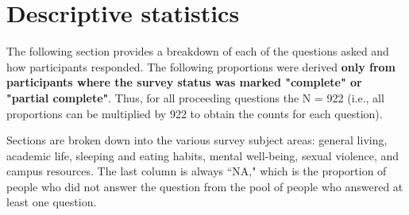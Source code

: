 \documentclass{article}\usepackage[]{graphicx}\usepackage[]{color}
\begin{document}
\pagebreak
\section{Descriptive statistics}
The following section provides a breakdown of each of the questions asked and how participants responded. The following proportions were derived \textbf{only from participants where the survey status was marked "complete" or "partial complete"}. Thus, for all proceeding questions the N = 922 (i.e., all proportions can be multiplied by 922 to obtain the counts for each question).

Sections are broken down into the various survey subject areas: general living, academic life, sleeping and eating habits, mental well-being, sexual violence, and campus resources. The last column is always ``NA," which is the proportion of people who did not answer the question from the pool of people who answered at least one question.
\end{document}
